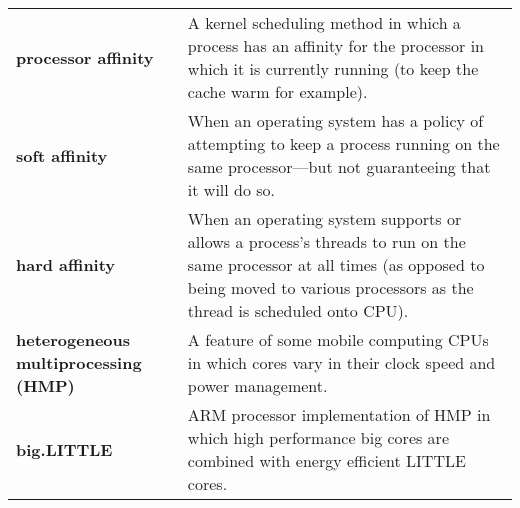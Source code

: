 \begin{tabular}{>{\raggedright}p{} >{\raggedright\arraybackslash}p{}}
\textbf{processor affinity} & A kernel scheduling method in which a process has an affinity for the processor in which it is currently running (to keep the cache warm for example). \\
\textbf{soft affinity} & When an operating system has a policy of attempting to keep a process running on the same processor—but not guaranteeing that it will do so. \\
\textbf{hard affinity} & When an operating system supports or allows a process's threads to run on the same processor at all times (as opposed to being moved to various processors as the thread is scheduled onto CPU). \\
\textbf{heterogeneous multiprocessing (HMP)} & A feature of some mobile computing CPUs in which cores vary in their clock speed and power management. \\
\textbf{big.LITTLE} & ARM processor implementation of HMP in which high performance big cores are combined with energy efficient LITTLE cores. \\
\bottomrule
\end{tabular}
\vspace{\baselineskip}

